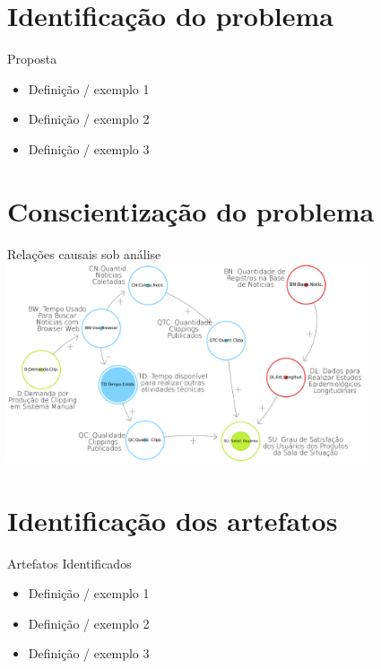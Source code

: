 \section{Identificação do problema}
\begin{frame}{Proposta}
	\begin{itemize}
		\item Definição / exemplo 1
		\item Definição / exemplo 2
		\item Definição / exemplo 3
	\end{itemize}
\end{frame}

\section{Conscientização do problema}
	\begin{frame}{Relações causais sob análise}
		\centering
		\includegraphics[width=0.8\textwidth]{ProducaoClippingManual.png}
	\end{frame}


\section{Identificação dos artefatos}
\begin{frame}{Artefatos Identificados}
	\begin{itemize}
		\item Definição / exemplo 1
		\item Definição / exemplo 2
		\item Definição / exemplo 3
	\end{itemize}
\end{frame}

